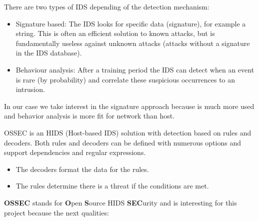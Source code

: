\linej
There are two types of IDS depending of the detection mechanism:
\begin{itemize}
	\item Signature based: The IDS looks for specific data (signature), for example a string. This is often an efficient solution to known attacks, but is fundamentally useless against unknown attacks (attacks without a signature in the IDS database).
	\item Behaviour analysis: After a training period the IDS can detect when an event is rare (by probability) and correlate these suspicious occurrences to an intrusion.
\end{itemize}
In our case we take interest in the signature approach because is much more used and behavior analysis is more fit for network than host.

\linej
\linej
OSSEC is an HIDS (Host-based IDS) solution with detection based on rules and decoders. Both rules and decoders can be defined with numerous options and support dependencies and regular expressions.
\begin{itemize}
	\item The decoders format the data for the rules.
	\item The rules determine there is a threat if the conditions are met.
\end{itemize}
\linej
\textbf{OSSEC} stands for \textbf{O}pen \textbf{S}ource HIDS \textbf{SEC}urity and is interesting for this project because the next qualities\cite{ossec}\cite{wazuh_additional_functionality}:

